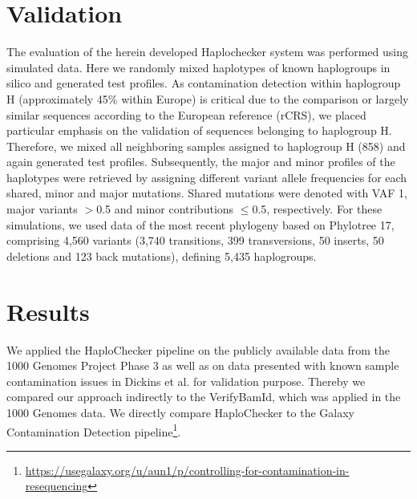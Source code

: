 \section{Validation}
The evaluation of the herein developed Haplochecker system was performed using simulated data. Here we randomly mixed haplotypes of known haplogroups in silico and generated test profiles. As contamination detection within haplogroup H (approximately 45\% within Europe) is critical due to the comparison or largely similar sequences according to the European reference (rCRS), we placed particular emphasis on the validation of sequences belonging to haplogroup H. Therefore, we mixed all neighboring samples assigned to haplogroup H (858) and again generated test profiles. Subsequently, the major and minor profiles of the haplotypes were retrieved by assigning different variant allele frequencies for each shared, minor and major mutations. Shared mutations were denoted with VAF 1, major variants $>$0.5 and minor contributions $\leq$0.5, respectively. For these simulations, we used data of the most recent phylogeny based on Phylotree 17, comprising 4,560 variants (3,740 transitions, 399 transversions, 50 inserts, 50 deletions and 123 back mutations), defining 5,435 haplogroups.  


\section{Results}\label{cont:result}
We applied the HaploChecker pipeline on the publicly available data from the 1000 Genomes Project Phase 3 \cite{Sudmant2015,Auton2015} as well as on data presented with known sample contamination issues in Dickins et al. \cite{Dickins2014} for validation purpose. Thereby we compared our approach indirectly to the VerifyBamId, which was applied in the 1000 Genomes data. We directly compare 
HaploChecker to the Galaxy Contamination Detection pipeline\footnote{\url{https://usegalaxy.org/u/aun1/p/controlling-for-contamination-in-resequencing}}.


